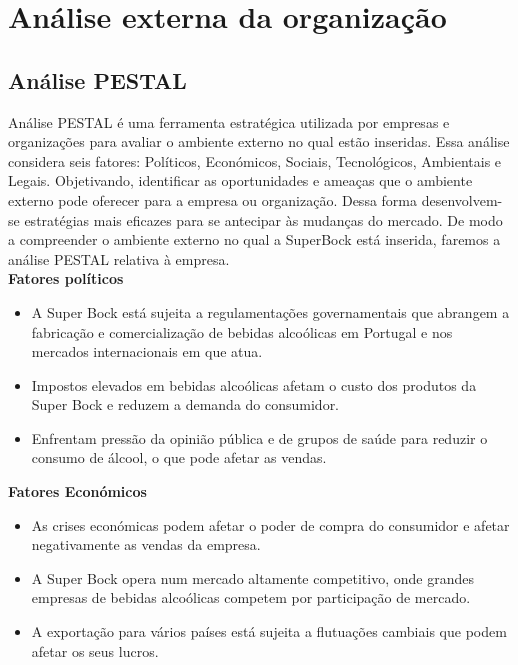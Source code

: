 \chapter{Análise externa da organização}
\label{Chapter3} %

\section{Análise PESTAL}

Análise PESTAL é uma ferramenta estratégica utilizada por empresas e organizações para avaliar o ambiente externo no qual estão inseridas. Essa análise considera seis fatores: Políticos, Económicos, Sociais, Tecnológicos, Ambientais e Legais. Objetivando, identificar as oportunidades e ameaças que o ambiente externo pode oferecer para a empresa ou organização. Dessa forma desenvolvem-se estratégias mais eficazes para se antecipar às mudanças do mercado\cite{ref6}. De modo a compreender o ambiente externo no qual a SuperBock está inserida, faremos a análise PESTAL relativa à empresa.\\


\noindent \textbf{Fatores políticos} %
\begin{itemize}
    \item A Super Bock está sujeita a regulamentações governamentais que abrangem a fabricação e comercialização de bebidas alcoólicas em Portugal e nos mercados internacionais em que atua\cite{ref7}.
    \item Impostos elevados em bebidas alcoólicas afetam o custo dos produtos da Super Bock e reduzem a demanda do consumidor.
    \item Enfrentam pressão da opinião pública e de grupos de saúde para reduzir o consumo de álcool, o que pode afetar as vendas.
\end{itemize}


\noindent \textbf{Fatores Económicos} %
\begin{itemize}
    \item As crises económicas podem afetar o poder de compra do consumidor e afetar negativamente as vendas da empresa.
    \item A Super Bock opera num mercado altamente competitivo, onde grandes empresas de bebidas alcoólicas competem por participação de mercado\cite{ref7}.
    \item A exportação para vários países está sujeita a flutuações cambiais que podem afetar os seus lucros\cite{ref7}.
\end{itemize}

